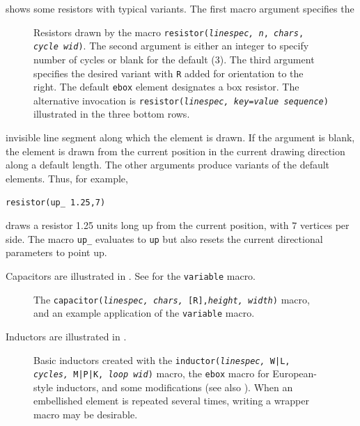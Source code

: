  shows some resistors with typical variants.
The first macro argument specifies the
\begin{figure}[H]
   
   \caption{Resistors drawn by the macro
   {\tt resistor({\sl linespec, n}, {\sl chars}, {\sl cycle wid})}.
   The second argument is either an integer to specify number of cycles
   or blank for the default (3).
   The third argument specifies the desired variant with {\tt R} added for
   orientation to the right.
   The default {\tt ebox} element designates a box resistor.
   The alternative invocation is {\tt resistor({\sl linespec,
    key}={\sl value sequence})} illustrated in the three bottom rows.
   \label{Resistors}}%
   \end{figure}
\noindent%
invisible line segment along which the element is drawn.
If the argument is blank,
the element is drawn from the current position in the current drawing
direction along a default length.
The other arguments produce variants of the default elements.
Thus, for example,
\par
{\tt resistor(up\_ 1.25,7)}
\par
\noindent%
draws a resistor 1.25 units long up from the current position, with $7$
vertices per side.
The macro {\tt up\_} evaluates to {\tt up} but also resets the current
directional parameters to point up.

Capacitors are illustrated in .
See  for the {\tt variable} macro.
\begin{figure}[H]
   
   \caption{The {\tt capacitor({\sl linespec, chars,} [R],{\sl height, width})}
      macro, and an example application of the {\tt variable} macro.}
   \label{Capacitors}
    \end{figure}

\pagebreak
Inductors are illustrated in .
\begin{figure}[H]
   
   \caption{Basic inductors created with the
    {\tt inductor({\sl linespec,} W|L, {\sl cycles,} M|P|K, {\sl loop wid})}
    macro, the {\tt ebox} macro for European-style inductors, and some
    modifications (see also ).
    When an embellished element is repeated several times,
    writing a wrapper macro may be desirable.}
   \label{Inductors}
    \end{figure}

